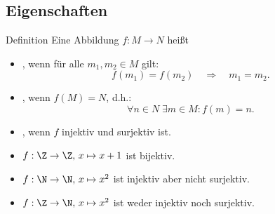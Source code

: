 \subsection{Eigenschaften}
%
\begin{frame}
	
	\begin{block}{Definition}
		Eine Abbildung $f: M\to N$ hei{\ss}t 
		\begin{itemize}
			\item {}, wenn für alle $m_1, m_2 \in M$ gilt:
				$$	f(m_1) = f(m_2)	
					\quad
					\Rightarrow
					\quad
					m_1 = m_2.
				$$ \pause
			\item {}, wenn $f(M)=N$, d.h.:
				$$
					\forall n\in N\; \exists m\in M: f(m)=n.
				$$\pause
			\item {}, wenn $f$ injektiv und surjektiv ist.
		\end{itemize}
	\end{block}
	
\end{frame}
%
%
\begin{frame}
	
	\begin{itemize}
		\item $f: \Z \to \Z,\, x\mapsto x+1$ 
			\pause 
			ist bijektiv.
		\pause
		\item $f: \N \to \N,\, x\mapsto x^2$ 
			\pause
			ist injektiv aber nicht surjektiv. 
		\pause
		\item $f:\Z \to \N,\, x\mapsto x^2$ 
			\pause
			ist weder injektiv noch surjektiv.
	\end{itemize}
	
\end{frame}
%

